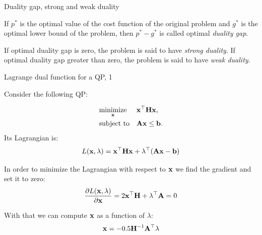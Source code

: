 \documentclass{beamer}
\begin{document}
\begin{frame}{Duality gap, strong and weak duality}
	\begin{flushleft}
		
		If $p^*$ is the optimal value of the cost function of the original problem and $g^*$ is the optimal lower bound of the problem, then $p^* - g^*$ is called optimal \emph{duality gap}.
		
		\bigskip
		
		If optimal duality gap is zero, the problem is said to have \emph{strong duality}. If optimal duality gap greater than zero, the problem is said to have \emph{weak duality}.
		
	\end{flushleft}
\end{frame}



\begin{frame}{Lagrange dual function for a QP, 1}
	\begin{flushleft}
		
		Consider the following QP:
		
		\begin{equation}
			\begin{aligned}
				& \underset{\mathbf{x}}{\text{minimize}}
				& & \mathbf{x}^\top \mathbf{H} \mathbf{x}, \\
				& \text{subject to}
				& & \mathbf{A}\mathbf{x} \leq \mathbf{b}.
			\end{aligned}
		\end{equation}
		Its Lagrangian is:
		\begin{equation}
			L(\mathbf{x}, \lambda) = \mathbf{x}^\top \mathbf{H} \mathbf{x} + \lambda^\top (\mathbf{A}\mathbf{x} - \mathbf{b})
		\end{equation}
		
		In order to minimize the Lagrangian with respect to $\mathbf{x}$ we find the gradient and set it to zero:
		\begin{equation}
			\frac{\partial L(\mathbf{x}, \lambda)}{\partial \mathbf{x}} = 2\mathbf{x}^\top \mathbf{H} + \lambda^\top \mathbf{A} = 0
		\end{equation}
		
		With that we can compute $\mathbf{x}$ as a function of $\lambda$:
		\begin{equation}
			\mathbf{x} = -0.5\mathbf{H}^{-1}\mathbf{A}^\top \lambda
		\end{equation}
		
	\end{flushleft}
\end{frame}
\end{document}
